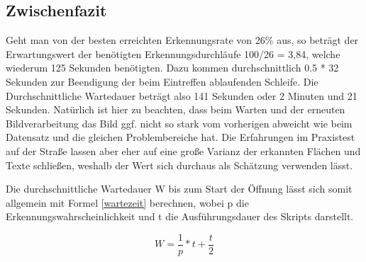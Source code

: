 \subsection{Zwischenfazit}
Geht man von der besten erreichten Erkennungsrate von 26\% aus, so beträgt der Erwartungswert der benötigten Erkennungsdurchläufe 100/26 = 3,84, welche wiederum 125 Sekunden benötigten. Dazu kommen durchschnittlich 0.5 * 32 Sekunden zur Beendigung der beim Eintreffen ablaufenden Schleife. Die Durchschnittliche Wartedauer beträgt also 141 Sekunden oder 2 Minuten und 21 Sekunden. 
\newline Natürlich ist hier zu beachten, dass beim Warten und der erneuten Bildverarbeitung das Bild ggf. nicht so stark vom vorherigen abweicht wie beim Datensatz und die gleichen Problembereiche hat. Die Erfahrungen im Praxistest auf der Straße lassen aber eher auf eine große Varianz der erkannten Flächen und Texte schließen, weshalb der Wert sich durchaus als Schätzung verwenden lässt.

Die durchschnittliche Wartedauer W bis zum Start der Öffnung lässt sich somit allgemein mit  Formel \ref{wartezeit} berechnen, wobei p die Erkennungswahrscheinlichkeit und t die Ausführungsdauer des Skripts darstellt.

\begin{equation}
	W=\frac{1}{p} * t + \frac{t}{2}
\label{wartezeit}
\end{equation}
